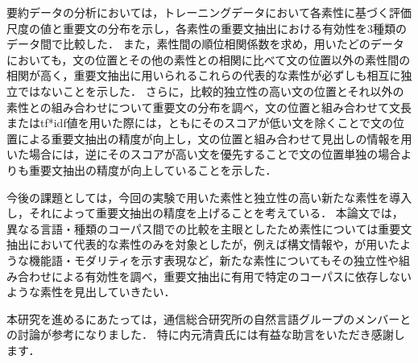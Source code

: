 要約データの分析においては，トレーニングデータにおいて各素性に基づく評価尺度の値と重要文の分布を示し，各素性の重要文抽出における有効性を3種類のデータ間で比較した．
また，素性間の順位相関係数を求め，用いたどのデータにおいても，文の位置とその他の素性との相関に比べて文の位置以外の素性間の相関が高く，重要文抽出に用いられるこれらの代表的な素性が必ずしも相互に独立ではないことを示した．
さらに，比較的独立性の高い文の位置とそれ以外の素性との組み合わせについて重要文の分布を調べ，文の位置と組み合わせて文長またはtf*idf値を用いた際には，ともにそのスコアが低い文を除くことで文の位置による重要文抽出の精度が向上し，文の位置と組み合わせて見出しの情報を用いた場合には，逆にそのスコアが高い文を優先することで文の位置単独の場合よりも重要文抽出の精度が向上していることを示した．

今後の課題としては，今回の実験で用いた素性と独立性の高い新たな素性を導入し，それによって重要文抽出の精度を上げることを考えている．
本論文では，異なる言語・種類のコーパス間での比較を主眼としたため素性については重要文抽出において代表的な素性のみを対象としたが，例えば構文情報や，\cite{hirao:phdthesis}が用いたような機能語・モダリティを示す表現など，新たな素性についてもその独立性や組み合わせによる有効性を調べ，重要文抽出に有用で特定のコーパスに依存しないような素性を見出していきたい．

\begin{acknowledgment}
本研究を進めるにあたっては，通信総合研究所の自然言語グループのメンバーとの討論が参考になりました．
特に内元清貴氏には有益な助言をいただき感謝します．
\end{acknowledgment}



